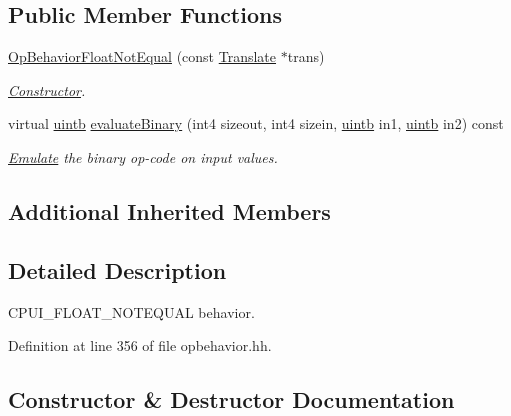 \subsection*{Public Member Functions}
\begin{DoxyCompactItemize}
\item 
\mbox{\hyperlink{class_op_behavior_float_not_equal_a20050febbd90544adf7097bb1d0b022d}{Op\+Behavior\+Float\+Not\+Equal}} (const \mbox{\hyperlink{class_translate}{Translate}} $\ast$trans)
\begin{DoxyCompactList}\small\item\em \mbox{\hyperlink{class_constructor}{Constructor}}. \end{DoxyCompactList}\item 
virtual \mbox{\hyperlink{types_8h_a2db313c5d32a12b01d26ac9b3bca178f}{uintb}} \mbox{\hyperlink{class_op_behavior_float_not_equal_a4e0acf16f0848572ebf965f489f2db9f}{evaluate\+Binary}} (int4 sizeout, int4 sizein, \mbox{\hyperlink{types_8h_a2db313c5d32a12b01d26ac9b3bca178f}{uintb}} in1, \mbox{\hyperlink{types_8h_a2db313c5d32a12b01d26ac9b3bca178f}{uintb}} in2) const
\begin{DoxyCompactList}\small\item\em \mbox{\hyperlink{class_emulate}{Emulate}} the binary op-\/code on input values. \end{DoxyCompactList}\end{DoxyCompactItemize}
\subsection*{Additional Inherited Members}


\subsection{Detailed Description}
C\+P\+U\+I\+\_\+\+F\+L\+O\+A\+T\+\_\+\+N\+O\+T\+E\+Q\+U\+AL behavior. 

Definition at line 356 of file opbehavior.\+hh.



\subsection{Constructor \& Destructor Documentation}
\mbox{\label{class_op_behavior_float_not_equal_a20050febbd90544adf7097bb1d0b022d}} 
